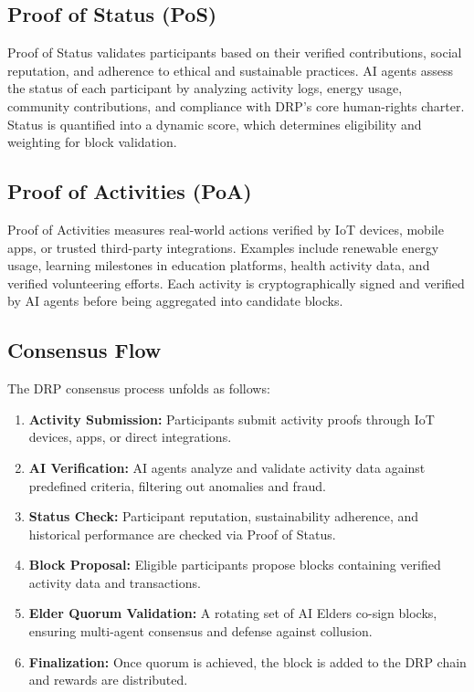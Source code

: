 \documentclass[11pt,a4paper]{article}
\begin{document}
\subsection{Proof of Status (PoS\*)}
Proof of Status validates participants based on their verified contributions, social reputation, and adherence to ethical and sustainable practices. 
AI agents assess the status of each participant by analyzing activity logs, energy usage, community contributions, and compliance with DRP’s core human-rights charter. 
Status is quantified into a dynamic score, which determines eligibility and weighting for block validation.

\subsection{Proof of Activities (PoA\*)}
Proof of Activities measures real-world actions verified by IoT devices, mobile apps, or trusted third-party integrations. 
Examples include renewable energy usage, learning milestones in education platforms, health activity data, and verified volunteering efforts. 
Each activity is cryptographically signed and verified by AI agents before being aggregated into candidate blocks. 

\subsection{Consensus Flow}
The DRP consensus process unfolds as follows:
\begin{enumerate}
    \item \textbf{Activity Submission:} Participants submit activity proofs through IoT devices, apps, or direct integrations.
    \item \textbf{AI Verification:} AI agents analyze and validate activity data against predefined criteria, filtering out anomalies and fraud.
    \item \textbf{Status Check:} Participant reputation, sustainability adherence, and historical performance are checked via Proof of Status.
    \item \textbf{Block Proposal:} Eligible participants propose blocks containing verified activity data and transactions.
    \item \textbf{Elder Quorum Validation:} A rotating set of AI Elders co-sign blocks, ensuring multi-agent consensus and defense against collusion.
    \item \textbf{Finalization:} Once quorum is achieved, the block is added to the DRP chain and rewards are distributed.
\end{enumerate}
\end{document}
